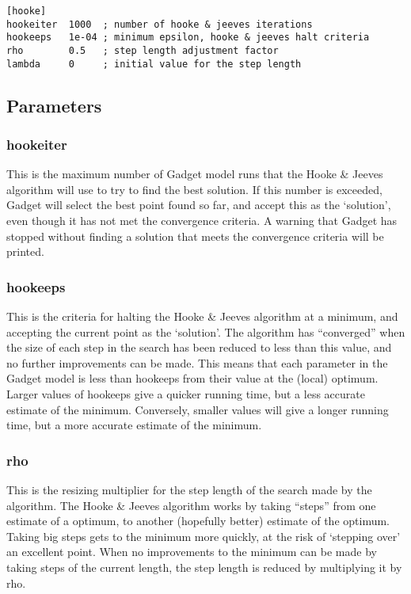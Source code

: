 \documentclass[]{book}
\begin{document}
\begin{verbatim}
[hooke]
hookeiter  1000  ; number of hooke & jeeves iterations
hookeeps   1e-04 ; minimum epsilon, hooke & jeeves halt criteria
rho        0.5   ; step length adjustment factor
lambda     0     ; initial value for the step length
\end{verbatim}

\hypertarget{subsec:hookepar}{%
\subsection{Parameters}\label{subsec:hookepar}}

\hypertarget{hookeiter}{%
\subsubsection{hookeiter}\label{hookeiter}}

This is the maximum number of Gadget model runs that the Hooke \& Jeeves
algorithm will use to try to find the best solution. If this number is
exceeded, Gadget will select the best point found so far, and accept
this as the `solution', even though it has not met the convergence
criteria. A warning that Gadget has stopped without finding a solution
that meets the convergence criteria will be printed.

\hypertarget{hookeeps}{%
\subsubsection{hookeeps}\label{hookeeps}}

This is the criteria for halting the Hooke \& Jeeves algorithm at a
minimum, and accepting the current point as the `solution'. The
algorithm has ``converged'' when the size of each step in the search has
been reduced to less than this value, and no further improvements can be
made. This means that each parameter in the Gadget model is less than
hookeeps from their value at the (local) optimum. Larger values of
hookeeps give a quicker running time, but a less accurate estimate of
the minimum. Conversely, smaller values will give a longer running time,
but a more accurate estimate of the minimum.

\hypertarget{rho}{%
\subsubsection{rho}\label{rho}}

This is the resizing multiplier for the step length of the search made
by the algorithm. The Hooke \& Jeeves algorithm works by taking ``steps''
from one estimate of a optimum, to another (hopefully better) estimate
of the optimum. Taking big steps gets to the minimum more quickly, at
the risk of `stepping over' an excellent point. When no improvements to
the minimum can be made by taking steps of the current length, the step
length is reduced by multiplying it by rho.
\end{document}
